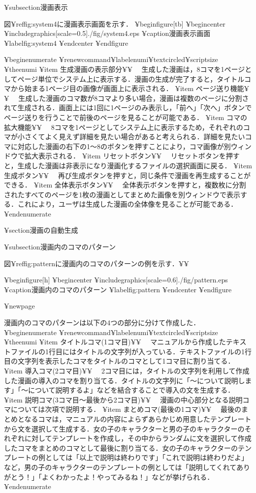 ¥subsection{漫画表示}

図¥ref{fig:system4}に漫画表示画面を示す．
¥begin{figure}[tb]
 ¥begin{center}
  ¥includegraphics[scale=0.5]{./fig/system4.eps}
  ¥caption{漫画表示画面}
  ¥label{fig:system4}
 ¥end{center}
¥end{figure}

¥begin{enumerate}
¥renewcommand{¥labelenumi}{¥textcircled{¥scriptsize ¥theenumi}}
¥item 生成漫画の表示部分¥¥
　生成した漫画は，8コマを1ページとしてページ単位でシステム上に表示する．漫画の生成が完了すると，タイトルコマから始まる1ページ目の画像が画面上に表示される．
¥item ページ送り機能¥¥
　生成した漫画のコマ数が8コマより多い場合，漫画は複数のページに分割されて生成される．画面上には1回に1ページのみ表示し，「前へ」「次へ」ボタンでページ送りを行うことで前後のページを見ることが可能である．
¥item コマの拡大機能¥¥
　8コマを1ページとしてシステム上に表示するため，それぞれのコマが小さくてよく見えず詳細を見たい場合があると考えられる．詳細を見たいコマに対応した漫画の右下の1〜8のボタンを押すことにより，コマ画像が別ウィンドウで拡大表示される．
¥item リセットボタン¥¥
　リセットボタンを押すと，生成した漫画は非表示になり漫画化するファイルの選択画面に戻る．
¥item 生成ボタン¥¥
　再び生成ボタンを押すと，同じ条件で漫画を再生成することができる．
¥item 全体表示ボタン¥¥
　全体表示ボタンを押すと，複数枚に分割されたすべてのページを1枚の漫画としてまとめた画像を別ウィンドウで表示する．これにより，ユーザは生成した漫画の全体像を見ることが可能である．
¥end{enumerate}

¥section{漫画の自動生成}

¥subsection{漫画内のコマのパターン}

図¥ref{fig:pattern}に漫画内のコマのパターンの例を示す．¥¥

¥begin{figure}[h]
 ¥begin{center}
  ¥includegraphics[scale=0.6]{./fig/pattern.eps}
  ¥caption{漫画内のコマのパターン}
  ¥label{fig:pattern}
 ¥end{center}
¥end{figure}

¥newpage

漫画内のコマのパターンは以下の4つの部分に分けて作成した．
¥begin{enumerate}
¥renewcommand{¥labelenumi}{¥textcircled{¥scriptsize ¥theenumi}}
¥item タイトルコマ(1コマ目)¥¥
　マニュアルから作成したテキストファイルの1行目にはタイトルの文字列が入っている．テキストファイルの1行目の文字列を表示したコマをタイトルのコマとして1コマ目に割り当てる．
¥item 導入コマ(2コマ目)¥¥
　2コマ目には，タイトルの文字列を利用して作成した漫画の導入のコマを割り当てる．タイトルの文字列に「〜について説明します」「〜について説明するよ」などを結合することで導入の文を生成する．
¥item 説明コマ(3コマ目〜最後から2コマ目)¥¥
　漫画の中心部分となる説明コマについては次項で説明する． 
¥item まとめコマ(最後の1コマ)¥¥
　最後のまとめとなるコマは，マニュアルの内容によらずあらかじめ用意したテンプレートから文を選択して生成する．女の子のキャラクターと男の子のキャラクターのそれぞれに対してテンプレートを作成し，その中からランダムに文を選択して作成したコマをまとめのコマとして最後に割り当てる．女の子のキャラクターのテンプレートの例としては「以上で説明は終わりです」「これで説明は終わりだよ」など，男の子のキャラクターのテンプレートの例としては「説明してくれてありがとう！」「よくわかったよ！やってみるね！」などが挙げられる．
¥end{enumerate}

